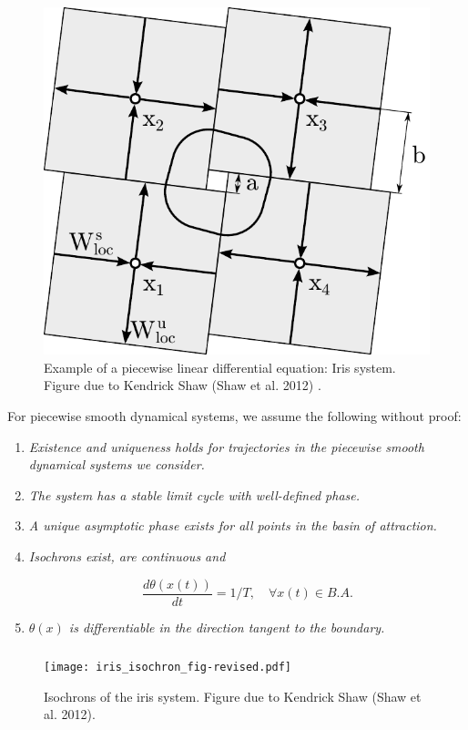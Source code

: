 \documentclass{beamer}
\begin{document}
\begin{frame}
 \begin{figure}
 \frametitle{\insertsection}
  \framesubtitle{\insertsubsection}
  \includegraphics[width=.5\textwidth]{sine_to_iris_fig_sketch_iris.pdf}
  \caption{Example of a piecewise linear differential equation: Iris system.  Figure due to Kendrick Shaw (Shaw et al. 2012) \cite{ShawParkChielThomas2012SIADS}.}
 \end{figure}
\end{frame}


\begin{frame}
  For piecewise smooth dynamical systems, we assume the following without proof:
  \begin{enumerate}
\item \textit{Existence and uniqueness holds for trajectories in the piecewise smooth dynamical systems we consider.}
 
 \item \textit{The system has a stable limit cycle with well-defined phase.}
 
 \item \textit{A unique asymptotic phase exists for all points in the basin of attraction.}
 
 \item \textit{Isochrons exist, are continuous and}
 
\begin{equation}
\frac{d\theta(x(t))}{dt} = 1/T, \quad \forall x(t) \in B.A.
\end{equation}
 
 \item \textit{$\theta(x)$ is differentiable in the direction tangent to the boundary.}
  \end{enumerate}
\end{frame}

\begin{frame}
 \begin{figure}
 \frametitle{\insertsection}
  \framesubtitle{\insertsubsection}
  \texttt{[image: iris\_isochron\_fig-revised.pdf]}
  \caption{Isochrons of the iris system.  Figure due to Kendrick Shaw (Shaw et al. 2012).}
 \end{figure}
\end{frame}
\end{document}
